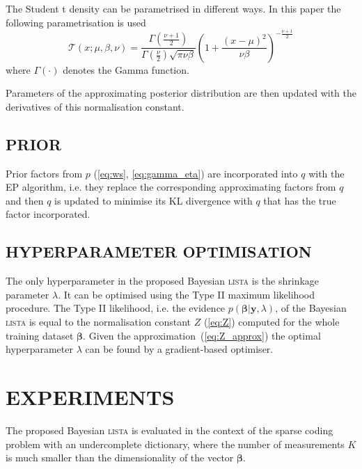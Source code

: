 \documentclass[letterpaper]{article}
\begin{document}
The Student t density can be parametrised in different ways. In this paper the following parametrisation is used 
\begin{equation}
\mathcal{T}(x; \mu, \beta, \nu) = \frac{\Gamma\left(\frac{\nu + 1}{2}\right)}{\Gamma\left(\frac{\nu}{2}\right)\sqrt{\pi \nu \beta}} \left(1 + \frac{(x - \mu)^2}{\nu\beta}\right)^{-\frac{\nu + 1}{2}}
\end{equation}
where $\Gamma(\cdot)$ denotes the Gamma function.

Parameters of the approximating posterior distribution are then updated with the derivatives of this normalisation constant.

\subsection{\uppercase{Prior}}
Prior factors from $p$ (\ref{eq:ws}, \ref{eq:gamma_eta}) are incorporated into $q$ with the EP algorithm, i.e. they replace the corresponding approximating factors from $q$ and then $q$ is updated to minimise its KL divergence with $q$ that has the true factor incorporated.

\subsection{\uppercase{Hyperparameter optimisation}}
The only hyperparameter in the proposed Bayesian \textsc{lista} is the shrinkage parameter $\lambda$. It can be optimised using the Type II maximum likelihood procedure. The Type II likelihood, i.e. the evidence $p(\boldsymbol\beta | \mathbf{y}, \lambda)$, of the Bayesian \textsc{lista} is equal to the normalisation constant $Z$ (\ref{eq:Z}) computed for the whole training dataset $\boldsymbol\beta$. Given the approximation~(\ref{eq:Z_approx}) the optimal hyperparameter $\lambda$ can be found by a gradient-based optimiser.

\section{\uppercase{Experiments}}
\label{sec:experiments}
The proposed Bayesian \textsc{lista} is evaluated in the context of the sparse coding problem with an undercomplete dictionary, where the number of measurements $K$ is much smaller than the dimensionality of the vector $\boldsymbol\beta$.
\end{document}
